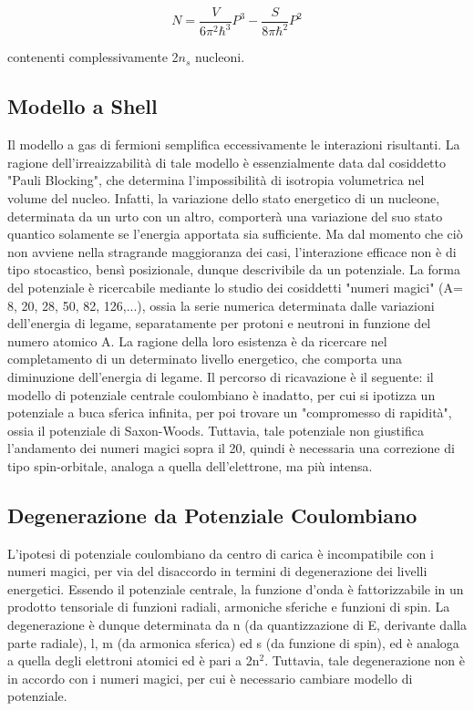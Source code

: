 \documentclass{article}
\begin{document}
\begin{equation}
    N= \frac{V}{6\pi^2 \hbar^3}P^3 - \frac{S}{8\pi\hbar^2}P^2
\end{equation}

contenenti complessivamente 2$n_s$ nucleoni.

\subsection{Modello a Shell}
Il modello a gas di fermioni semplifica eccessivamente le interazioni risultanti.
La ragione dell'irreaizzabilità di tale modello è essenzialmente data dal cosiddetto "Pauli Blocking", che determina
l'impossibilità di isotropia volumetrica nel volume del nucleo.
Infatti, la variazione dello stato energetico di un nucleone, determinata da un urto con un altro,
comporterà una variazione del suo stato quantico solamente se l'energia apportata sia sufficiente.
Ma dal momento che ciò non avviene nella stragrande maggioranza dei casi, l'interazione efficace non è di tipo
stocastico, bensì posizionale, dunque descrivibile da un potenziale.
La forma del potenziale è ricercabile mediante lo studio dei cosiddetti "numeri magici" (A= 8, 20, 28, 50, 82, 126,...), ossia la serie numerica determinata dalle variazioni dell'energia di legame, separatamente per protoni e neutroni in funzione del numero atomico A.
La ragione della loro esistenza è da ricercare nel completamento di un determinato livello energetico, che comporta una diminuzione dell'energia di legame.
Il percorso di ricavazione è il seguente: il modello di potenziale centrale coulombiano è inadatto, per cui si ipotizza un potenziale a buca sferica infinita, per poi trovare un "compromesso di rapidità", ossia il potenziale di Saxon-Woods.
Tuttavia, tale potenziale non giustifica l'andamento dei numeri magici sopra il 20, quindi è necessaria una correzione di tipo spin-orbitale, analoga a quella dell'elettrone, ma più intensa.

\subsection{Degenerazione da Potenziale Coulombiano}
L'ipotesi di potenziale coulombiano da centro di carica è incompatibile con i numeri magici, per via del disaccordo in termini di degenerazione dei livelli energetici.
Essendo il potenziale centrale, la funzione d'onda è fattorizzabile in un prodotto tensoriale di funzioni radiali, armoniche sferiche e funzioni di spin.
La degenerazione è dunque determinata da n (da quantizzazione di E, derivante dalla parte radiale), l, m (da armonica sferica) ed s (da funzione di spin), ed è analoga a quella degli elettroni atomici ed è pari a 2n$^2$.
Tuttavia, tale degenerazione non è in accordo con i numeri magici, per cui è necessario cambiare modello di potenziale.
\end{document}

